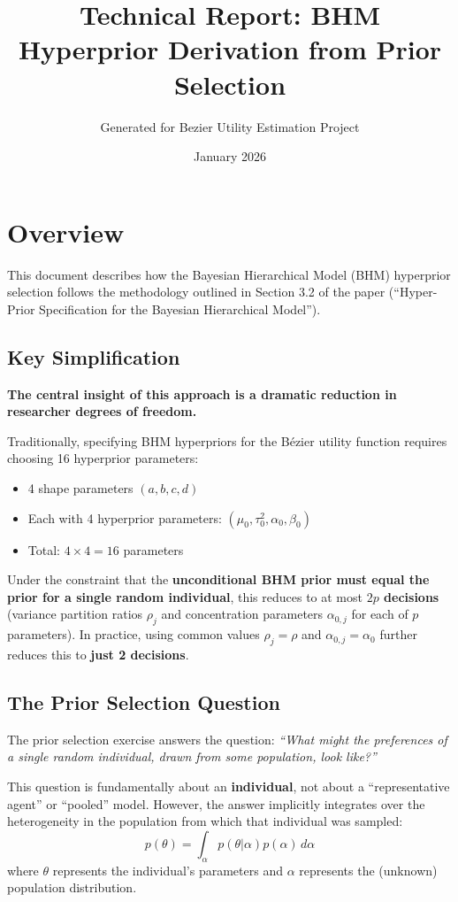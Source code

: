 \documentclass[11pt]{article}
\title{Technical Report: BHM Hyperprior Derivation from Prior Selection}
\author{Generated for Bezier Utility Estimation Project}
\date{January 2026}
\begin{document}
\maketitle

\section{Overview}

This document describes how the Bayesian Hierarchical Model (BHM) hyperprior selection follows the methodology outlined in Section 3.2 of the paper (``Hyper-Prior Specification for the Bayesian Hierarchical Model'').

\subsection{Key Simplification}

\textbf{The central insight of this approach is a dramatic reduction in researcher degrees of freedom.}

Traditionally, specifying BHM hyperpriors for the B\'{e}zier utility function requires choosing 16 hyperprior parameters:
\begin{itemize}
  \item 4 shape parameters $(a, b, c, d)$
  \item Each with 4 hyperprior parameters: $(\mu_0, \tau_0^2, \alpha_0, \beta_0)$
  \item Total: $4 \times 4 = 16$ parameters
\end{itemize}

Under the constraint that the \textbf{unconditional BHM prior must equal the prior for a single random individual}, this reduces to at most \textbf{$2p$ decisions} (variance partition ratios $\rho_j$ and concentration parameters $\alpha_{0,j}$ for each of $p$ parameters). In practice, using common values $\rho_j = \rho$ and $\alpha_{0,j} = \alpha_0$ further reduces this to \textbf{just 2 decisions}.

\subsection{The Prior Selection Question}

The prior selection exercise answers the question: \textit{``What might the preferences of a single random individual, drawn from some population, look like?''}

This question is fundamentally about an \textbf{individual}, not about a ``representative agent'' or ``pooled'' model. However, the answer implicitly integrates over the heterogeneity in the population from which that individual was sampled:
\begin{equation}
  p(\theta) = \int_\alpha p(\theta | \alpha) p(\alpha) \, d\alpha
  \label{eq:unconditional}
\end{equation}
where $\theta$ represents the individual's parameters and $\alpha$ represents the (unknown) population distribution.
\end{document}
